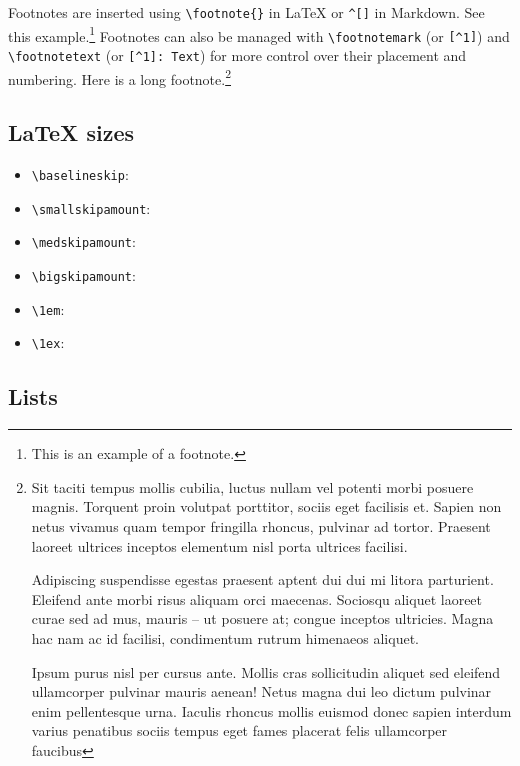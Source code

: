 \documentclass[
12pt,
a4paper,
twoside,
]{article}
\providecommand{\tightlist}{\setlength{\itemsep}{0pt}\setlength{\parskip}{0pt}}
\begin{document}
Footnotes are inserted using \texttt{\textbackslash{}footnote\{\}} in
LaTeX or \texttt{\^{}{[}{]}} in Markdown. See this example.\footnote{This
  is an example of a footnote.} Footnotes can also be managed with
\texttt{\textbackslash{}footnotemark} (or \texttt{{[}\^{}1{]}}) and
\texttt{\textbackslash{}footnotetext} (or \texttt{{[}\^{}1{]}:\ Text})
for more control over their placement and numbering. Here is a long
footnote.\footnote{Sit taciti tempus mollis cubilia, luctus nullam vel potenti morbi posuere magnis. Torquent proin volutpat porttitor, sociis eget facilisis et. Sapien non netus vivamus quam tempor fringilla rhoncus, pulvinar ad tortor. Praesent laoreet ultrices inceptos elementum nisl porta ultrices facilisi.

Adipiscing suspendisse egestas praesent aptent dui dui mi litora parturient. Eleifend ante morbi risus aliquam orci maecenas. Sociosqu aliquet laoreet curae sed ad mus, mauris – ut posuere at; congue inceptos ultricies. Magna hac nam ac id facilisi, condimentum rutrum himenaeos aliquet.

Ipsum purus nisl per cursus ante. Mollis cras sollicitudin aliquet sed eleifend ullamcorper pulvinar mauris aenean! Netus magna dui leo dictum pulvinar enim pellentesque urna. Iaculis rhoncus mollis euismod donec sapien interdum varius penatibus sociis tempus eget fames placerat felis ullamcorper faucibus}

\subsection{LaTeX sizes}\label{latex-sizes}

\begin{itemize}
\tightlist
\item
  \texttt{\textbackslash{}baselineskip}: \the\baselineskip
\item
  \texttt{\textbackslash{}smallskipamount}: \the\smallskipamount
\item
  \texttt{\textbackslash{}medskipamount}: \the\medskipamount
\item
  \texttt{\textbackslash{}bigskipamount}: \the\bigskipamount
\item
  \texttt{\textbackslash{}1em}: \the{}\font
\item
  \texttt{\textbackslash{}1ex}: \the{}\font
\end{itemize}

\subsection{Lists}\label{lists}
\end{document}
